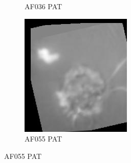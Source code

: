 \begin{figure}
\begin{subfigure}[b]{.24\linewidth}
\caption{AF036 PAT}
\end{subfigure}
\begin{subfigure}[b]{.24\linewidth}
\includegraphics[width=\linewidth]{Figs/PAT055_11.jpg}
\caption{AF055 PAT}
\end{subfigure}


\end{figure}
